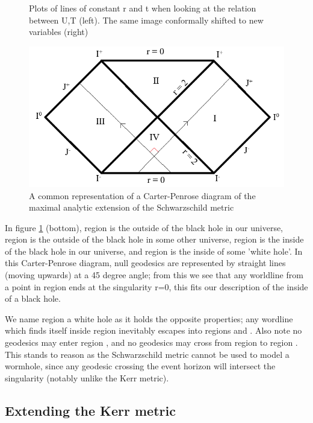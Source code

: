 \documentclass[oneside,openright,frontopenright, singlespacing]{dmathesis}
\begin{document}
\begin{figure}[!ht]
\begin{minipage}{0.5\textwidth}
	\end{minipage}
	\caption{Plots of lines of constant r and t when looking at the relation between U,T (left). The same image conformally shifted to new variables (right)}
	\includegraphics[width=0.6\linewidth]{img/carter-penrose3}
	\caption{A common representation of a Carter-Penrose diagram of the maximal analytic extension of the Schwarzschild metric}
	\label{fig:Figure6.1}
\end{figure}

\vspace{1em}
	In figure \ref{fig:Figure6.1} (bottom), region  is the outside of the black hole in our universe, region  is the outside of the black hole in some other universe, region  is the inside of the black hole in our universe, and region  is the inside of some 'white hole'. In this Carter-Penrose diagram, null geodesics are represented by straight lines (moving upwards) at a 45 degree angle; from this we see that any worldline from a point in region  ends at the singularity r=0, this fits our description of the inside of a black hole.

\vspace{1em}
	We name region  a white hole as it holds the opposite properties; any wordline which finds itself inside region  inevitably escapes into regions  and . Also note no geodesics may enter region , and no geodesics may cross from region  to region . This stands to reason as the Schwarzschild metric cannot be used to model a wormhole, since any geodesic crossing the event horizon will intersect the singularity (notably unlike the Kerr metric).

\subsection{Extending the Kerr metric}\label{subsec:Section6.1.2}
\end{document}
